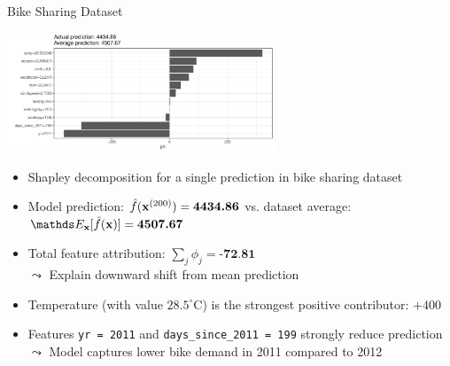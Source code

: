 \documentclass[10pt,compress,t,notes=noshow, xcolor=table]{beamer}
\begin{document}

\begin{frame}{Bike Sharing Dataset}

\begin{center}
\includegraphics[width=0.6\textwidth]{figure/shapley-bike.pdf}%
\end{center}

\begin{itemize}%
  \item Shapley decomposition for a single prediction in bike sharing dataset %
  \item Model prediction: $\hat{f}(\mathbf{x}^{(200)}) = \textbf{4434.86}$ vs. dataset average: $\E_\xv[\fh(\xv)] = \textbf{4507.67}$
  \item Total feature attribution: $\sum_j \phi_j = \textbf{-72.81}$\\
  $\leadsto$ Explain downward shift from mean prediction
  \item Temperature (with value $28.5^\circ$C) is the strongest positive contributor: $+400$
  \item Features \texttt{yr = 2011} and \texttt{days\_since\_2011 = 199} strongly reduce prediction\\
  $\leadsto$ Model captures lower bike demand in 2011 compared to 2012
\end{itemize}
\end{frame}
\end{document}
